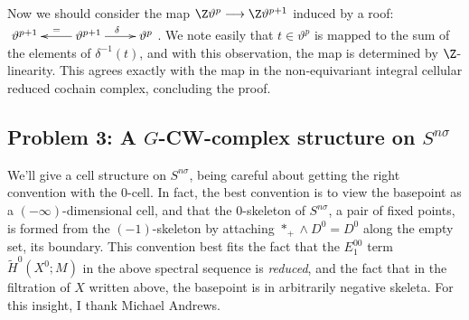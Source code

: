 \documentclass[11pt]{article}
\begin{document}
Now we should consider the map $\Z\vartheta^{p}\to\Z\vartheta^{p+1}$ induced by a roof: $\xymatrix{\vartheta^{p+1}&\ar[l]_=\vartheta^{p+1}\ar[r]^\delta&\vartheta^p}$\!. We note easily that $t\in\vartheta^p$ is mapped to the sum of the elements of $\delta^{-1}(t)$, and with this observation, the map is determined by $\Z$-linearity. This agrees exactly with the map in the non-equivariant integral cellular reduced cochain complex, concluding the proof.
\subsection*{Problem 3: A $G$-CW-complex structure on $S^{n\sigma}$}
We'll give a cell structure on $S^{n\sigma}$, being careful about getting the right convention with the $0$-cell. In fact, the best convention is to view the basepoint as a $(-\infty)$-dimensional cell, and that the $0$-skeleton of $S^{n\sigma}$, a pair of fixed points, is formed from the $(-1)$-skeleton by attaching $\ast_+\wedge D^0=D^0$ along the empty set, its boundary.
This convention best fits the fact that the $E_1^{00}$ term $\widetilde H^0(X^0;M)$ in the above spectral sequence is \emph{reduced}, and the fact that in the filtration of $X$ written above, the basepoint is in arbitrarily negative skeleta. For this insight, I thank Michael Andrews.
\end{document}
